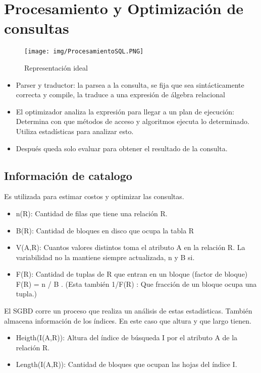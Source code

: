 \section{Procesamiento y Optimización de consultas}


\begin{figure}[!htb]
    \centering
    \texttt{[image: img/ProcesamientoSQL.PNG]}
    \caption{Representación ideal}
\end{figure}

\begin{itemize}
\item Parser y traductor: la parsea a la consulta, se fija que sea sintácticamente correcta y compile, la traduce a una expresión de álgebra relacional
\item El optimizador analiza la expresión para llegar a un plan de ejecución: Determina con que métodos de acceso y algoritmos ejecuta lo determinado. Utiliza estadísticas para analizar esto.
\item Después queda solo evaluar para obtener el resultado de la consulta.
\end{itemize}



\subsection*{Información de catalogo}
Es utilizada para estimar costos y optimizar las consultas.

\begin{itemize}
\item n(R): Cantidad de filas que tiene una relación R.
\item B(R): Cantidad de bloques en disco que ocupa la tabla R
\item V(A,R): Cuantos valores distintos toma el atributo A en la relación R. La variabilidad no la mantiene siempre actualizada, n y B si.
\item F(R): Cantidad de tuplas de R que entran en un bloque (factor de bloque) F(R) = n / B . (Esta también  1/F(R) : Que fracción de un bloque ocupa una tupla.)
\end{itemize}

El SGBD corre un proceso que realiza un análisis de estas estadísticas. También almacena información de los índices. En este caso que altura y que largo tienen.


\begin{itemize}
\item Heigth(I(A,R)): Altura del índice de búsqueda I por el atributo A de la relación R.
\item Length(I(A,R)): Cantidad de bloques que ocupan las hojas del índice I.
\end{itemize}

